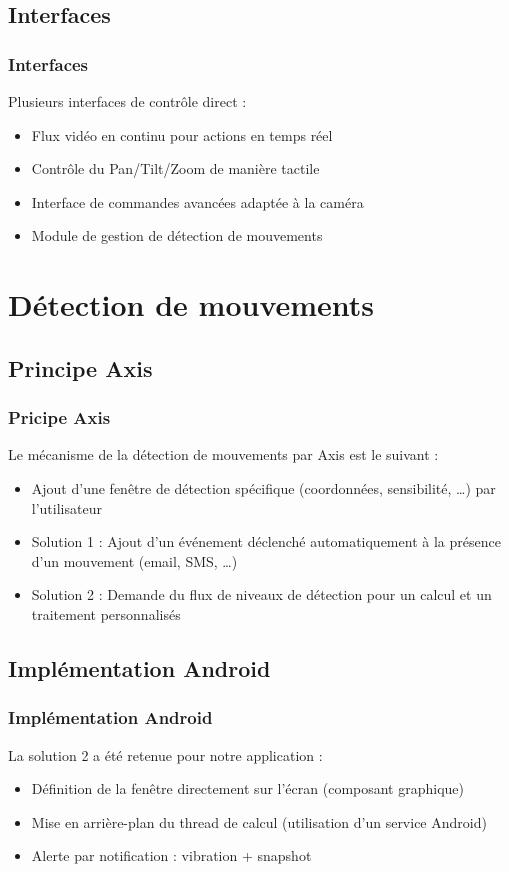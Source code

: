\documentclass{beamer}
\begin{document}
\subsection{Interfaces}
 \begin{frame}
\frametitle{Interfaces}
   Plusieurs interfaces de contrôle direct :
   \begin{itemize}
    \item<2-> Flux vidéo en continu pour actions en temps réel
    \item<3-> Contrôle du Pan/Tilt/Zoom de manière tactile
    \item<4-> Interface de commandes avancées adaptée à la caméra
    \item<5-> Module de gestion de détection de mouvements
   \end{itemize}
\end{frame}

\section{Détection de mouvements}
\subsection{Principe Axis}
 \begin{frame}
   \frametitle{Pricipe Axis}
    Le mécanisme de la détection de mouvements par Axis est le suivant :
   \begin{itemize}
    \item<2-> Ajout d'une fenêtre de détection spécifique (coordonnées,
    sensibilité, \ldots) par l'utilisateur
    \item<3-> Solution 1 : Ajout d'un événement déclenché automatiquement à la
    présence d'un mouvement (email, SMS, \ldots)
    \item<4-> Solution 2 : Demande du flux de niveaux de détection pour un
    calcul et un traitement personnalisés
   \end{itemize}
\end{frame}

\subsection{Implémentation Android}
 \begin{frame}
   \frametitle{Implémentation Android}
    La solution 2 a été retenue pour notre application :
    \begin{itemize}
    \item<2-> Définition de la fenêtre directement sur l'écran (composant
    graphique)
    \item<4-> Mise en arrière-plan du thread de calcul (utilisation d'un service
    Android)
    \item<5-> Alerte par notification : vibration + snapshot
   \end{itemize}
\end{frame}
\end{document}
